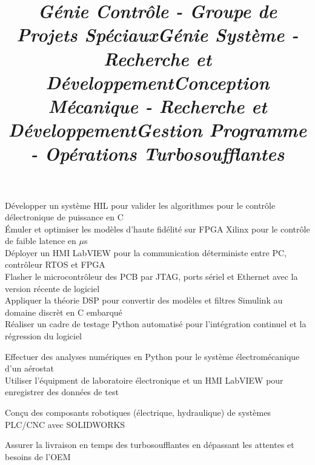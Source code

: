\documentclass[mm]{res}
\begin{document}
\begin{resume}
\title{\textsl{G\'enie Contr\^ole - Groupe de Projets Sp\'eciaux}}
\begin{position}
\tb D\'evelopper un syst\`eme HIL pour valider les algorithmes pour le contr\^ole d\textquotesingle \'electronique de puissance en C\\
\tb \'Emuler et optimiser les mod\`eles d'haute fid\'elit\'e sur FPGA Xilinx pour le contr\^ole de faible latence en $\mu$s\\
\tb D\'eployer un HMI LabVIEW pour la communication d\'eterministe entre PC, contr\^oleur RTOS et FPGA\\
\tb Flasher le microcontr\^oleur des PCB par JTAG, ports s\'eriel et Ethernet avec la version r\'ecente de logiciel \\
\tb Appliquer la th\'eorie DSP pour convertir des mod\`eles et filtres Simulink au domaine discr\`et en C embarqu\'e\\
\tb R\'ealiser un cadre de testage Python automatis\'e pour l'int\'egration continuel et la r\'egression du logiciel
\end{position}

\title{\textsl{G\'enie Syst\`eme - Recherche et D\'eveloppement}}
\begin{position}
\tb Effectuer des analyses num\'eriques en Python pour le syst\`eme \'electrom\'ecanique d'un a\'erostat\\
\tb Utiliser l'\'equipment de laboratoire \'electronique et un HMI LabVIEW pour enregistrer des donn\'ees de test
\end{position}

\title{\textsl{Conception M\'ecanique - Recherche et D\'eveloppement}}
\begin{position}
\tb Con\c{c}u des composants robotiques (\'electrique, hydraulique) de syst\`emes PLC/CNC avec SOLIDWORKS
\end{position}

\title{\textsl{Gestion Programme - Op\'erations Turbosoufflantes}}
\begin{position}
\tb Assurer la livraison en temps des turbosoufflantes en d\'epassant les attentes et besoins de l'OEM
\end{position}


\end{resume}
\end{document}
